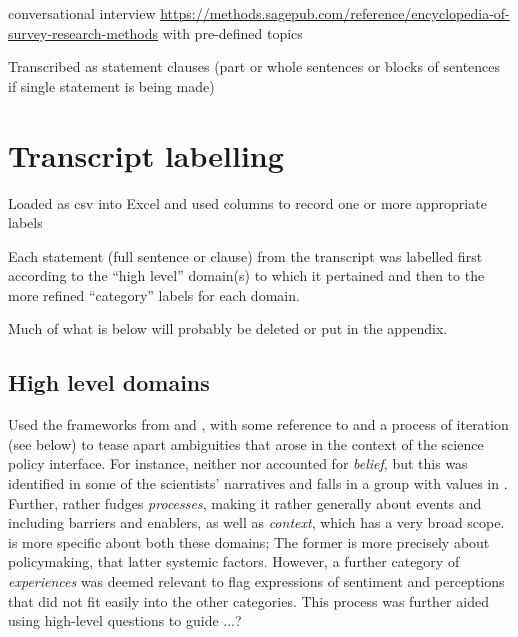 conversational interview \url{https://methods.sagepub.com/reference/encyclopedia-of-survey-research-methods} with pre-defined topics

Transcribed as statement clauses (part or whole sentences or blocks of sentences if single statement is being made)

\section{Transcript labelling}

Loaded as csv into Excel and used columns to record one or more appropriate labels

Each statement (full sentence or clause) from the transcript was labelled first according to the ``high level'' domain(s) to which it pertained and then to the more refined ``category'' labels for each domain.

 Much of what is below will probably be deleted or put in the appendix.



\subsection{High level domains}
Used the frameworks from \textcite{BuseMW2012} and \textcite{HaynesDCRHGS2011}, with some reference to \textcite{DarntonH2013} and a process of iteration (see below) to tease apart ambiguities that arose in the context of the science policy interface. For instance, neither \textcite{BuseMW2012} nor \textcite{HaynesDCRHGS2011} accounted for \emph{belief}, but this was identified in some of the scientists' narratives and falls in a group with values in \textcite{DarntonH2013}. Further, \textcite{HaynesDCRHGS2011} rather fudges \emph{processes}, making it rather generally about events and including barriers and enablers, as well as \emph{context}, which has a very broad scope. \textcite{BuseMW2012} is more specific about both these domains; The former is more precisely about policymaking, that latter systemic factors. However, a further category of \emph{experiences} was deemed relevant to flag expressions of sentiment and perceptions that did not fit easily into the other categories. This process was further aided using high-level questions to guide ...?

